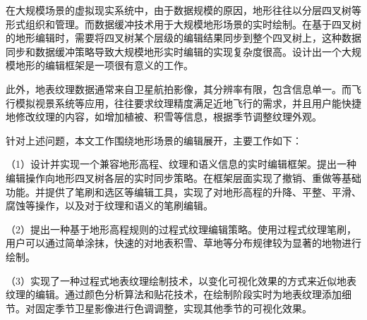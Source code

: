 
\begin{cabstract}
	在大规模场景的虚拟现实系统中，由于数据规模的原因，地形往往以分层四叉树等形式组织和管理。而数据缓冲技术用于大规模地形场景的实时绘制。在基于四叉树的地形编辑时，需要将四叉树某个层级的编辑结果同步到整个四叉树上，这种数据同步和数据缓冲策略导致大规模地形实时编辑的实现复杂度很高。设计出一个大规模地形的编辑框架是一项很有意义的工作。\par
	此外，地表纹理数据通常来自卫星航拍影像，其分辨率有限，包含信息单一。而飞行模拟视景系统等应用，往往要求纹理精度满足近地飞行的需求，并且用户能快捷地修改纹理的内容，如增加植被、积雪等信息，根据季节调整纹理外观。\par
	针对上述问题，本文工作围绕地形场景的编辑展开，主要工作如下：\par
	（1）设计并实现一个兼容地形高程、纹理和语义信息的实时编辑框架。提出一种编辑操作向地形四叉树各层的实时同步策略。在框架层面实现了撤销、重做等基础功能。并提供了笔刷和选区等编辑工具，实现了对地形高程的升降、平整、平滑、腐蚀等操作，以及对于纹理和语义的笔刷编辑。\par
	（2）提出一种基于地形高程规则的过程式纹理编辑策略。使用过程式纹理笔刷，用户可以通过简单涂抹，快速的对地表积雪、草地等分布规律较为显著的地物进行绘制。\par
	（3）实现了一种过程式地表纹理绘制技术，以变化可视化效果的方式来近似地表纹理的编辑。通过颜色分析算法和贴花技术，在绘制阶段实时为地表纹理添加细节。对固定季节卫星影像进行色调调整，实现其他季节的可视化效果。\par

\end{cabstract}
\cleardoublepage
